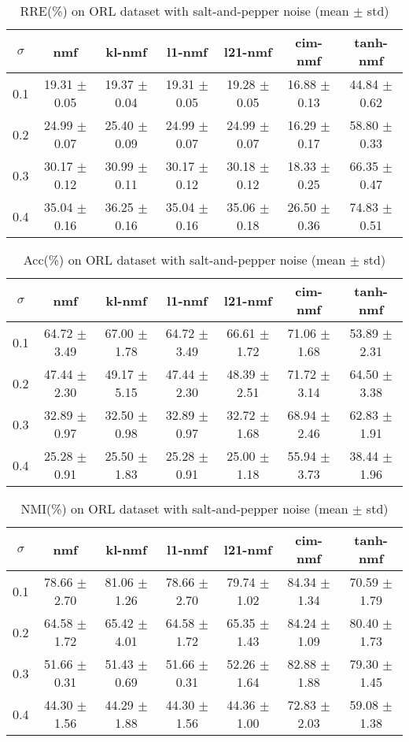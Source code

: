 \documentclass{article} %
\begin{document}
\begin{table}[H]
\begin{tabular}{c|cccccc}$\sigma$ & nmf & kl-nmf & l1-nmf & l21-nmf & cim-nmf & tanh-nmf \\\hline
0.1 & 19.31 $\pm$ 0.05 & 19.37 $\pm$ 0.04 & 19.31 $\pm$ 0.05 & 19.28 $\pm$ 0.05 & 16.88 $\pm$ 0.13 & 44.84 $\pm$ 0.62 \\
0.2 & 24.99 $\pm$ 0.07 & 25.40 $\pm$ 0.09 & 24.99 $\pm$ 0.07 & 24.99 $\pm$ 0.07 & 16.29 $\pm$ 0.17 & 58.80 $\pm$ 0.33 \\
0.3 & 30.17 $\pm$ 0.12 & 30.99 $\pm$ 0.11 & 30.17 $\pm$ 0.12 & 30.18 $\pm$ 0.12 & 18.33 $\pm$ 0.25 & 66.35 $\pm$ 0.47 \\
0.4 & 35.04 $\pm$ 0.16 & 36.25 $\pm$ 0.16 & 35.04 $\pm$ 0.16 & 35.06 $\pm$ 0.18 & 26.50 $\pm$ 0.36 & 74.83 $\pm$ 0.51 \\
\end{tabular}\caption{
  RRE(\%) on ORL dataset with salt-and-pepper noise (mean $\pm$ std)
  \label{tab:RRE-ORL-salt-and-pepper}
}\end{table}
\begin{table}[H]
\begin{tabular}{c|cccccc}$\sigma$ & nmf & kl-nmf & l1-nmf & l21-nmf & cim-nmf & tanh-nmf \\\hline
0.1 & 64.72 $\pm$ 3.49 & 67.00 $\pm$ 1.78 & 64.72 $\pm$ 3.49 & 66.61 $\pm$ 1.72 & 71.06 $\pm$ 1.68 & 53.89 $\pm$ 2.31 \\
0.2 & 47.44 $\pm$ 2.30 & 49.17 $\pm$ 5.15 & 47.44 $\pm$ 2.30 & 48.39 $\pm$ 2.51 & 71.72 $\pm$ 3.14 & 64.50 $\pm$ 3.38 \\
0.3 & 32.89 $\pm$ 0.97 & 32.50 $\pm$ 0.98 & 32.89 $\pm$ 0.97 & 32.72 $\pm$ 1.68 & 68.94 $\pm$ 2.46 & 62.83 $\pm$ 1.91 \\
0.4 & 25.28 $\pm$ 0.91 & 25.50 $\pm$ 1.83 & 25.28 $\pm$ 0.91 & 25.00 $\pm$ 1.18 & 55.94 $\pm$ 3.73 & 38.44 $\pm$ 1.96 \\
\end{tabular}\caption{
  Acc(\%) on ORL dataset with salt-and-pepper noise (mean $\pm$ std)
  \label{tab:Acc-ORL-salt-and-pepper}
}\end{table}
\begin{table}[H]
\begin{tabular}{c|cccccc}$\sigma$ & nmf & kl-nmf & l1-nmf & l21-nmf & cim-nmf & tanh-nmf \\\hline
0.1 & 78.66 $\pm$ 2.70 & 81.06 $\pm$ 1.26 & 78.66 $\pm$ 2.70 & 79.74 $\pm$ 1.02 & 84.34 $\pm$ 1.34 & 70.59 $\pm$ 1.79 \\
0.2 & 64.58 $\pm$ 1.72 & 65.42 $\pm$ 4.01 & 64.58 $\pm$ 1.72 & 65.35 $\pm$ 1.43 & 84.24 $\pm$ 1.09 & 80.40 $\pm$ 1.73 \\
0.3 & 51.66 $\pm$ 0.31 & 51.43 $\pm$ 0.69 & 51.66 $\pm$ 0.31 & 52.26 $\pm$ 1.64 & 82.88 $\pm$ 1.88 & 79.30 $\pm$ 1.45 \\
0.4 & 44.30 $\pm$ 1.56 & 44.29 $\pm$ 1.88 & 44.30 $\pm$ 1.56 & 44.36 $\pm$ 1.00 & 72.83 $\pm$ 2.03 & 59.08 $\pm$ 1.38 \\
\end{tabular}\caption{
  NMI(\%) on ORL dataset with salt-and-pepper noise (mean $\pm$ std)
  \label{tab:NMI-ORL-salt-and-pepper}
}\end{table}
\end{document}
